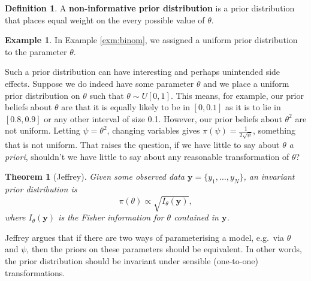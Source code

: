 \documentclass[
]{book}
\newtheorem{theorem}{Theorem}[chapter]
\theoremstyle{definition}
\newtheorem{definition}{Definition}[chapter]
\theoremstyle{definition}
\newtheorem{example}{Example}[chapter]
\theoremstyle{definition}
\theoremstyle{definition}
\theoremstyle{remark}
\begin{document}
\begin{definition}
A \textbf{non-informative prior distribution} is a prior distribution that places equal weight on the every possible value of \(\theta\).
\end{definition}

\begin{example}
In Example \ref{exm:binom}, we assigned a uniform prior distribution to the parameter \(\theta\).
\end{example}

Such a prior distribution can have interesting and perhaps unintended side effects. Suppose we do indeed have some parameter \(\theta\) and we place a uniform prior distribution on \(\theta\) such that \(\theta \sim U[0, 1]\). This means, for example, our prior beliefs about \(\theta\) are that it is equally likely to be in \([0, 0.1]\) as it is to lie in \([0.8, 0.9]\) or any other interval of size 0.1. However, our prior beliefs about \(\theta^2\) are not uniform. Letting \(\psi = \theta^2\), changing variables gives \(\pi(\psi) = \frac{1}{2\sqrt{\psi}}\), something that is not uniform. That raises the question, if we have little to say about \(\theta\) \textit{a priori}, shouldn't we have little to say about any reasonable transformation of \(\theta\)?

\begin{theorem}[Jeffrey]
Given some observed data \(\boldsymbol{y} = \{y_1, \ldots, y_N\}\), an invariant prior distribution is
\[
\pi(\theta) \propto \sqrt{I_\theta(\boldsymbol{y})},
\]
where \(I_\theta(\boldsymbol{y})\) is the Fisher information for \(\theta\) contained in \(\boldsymbol{y}\).
\end{theorem}

Jeffrey argues that if there are two ways of parameterising a model, e.g.~via \(\theta\) and \(\psi\), then the priors on these parameters should be equivalent. In other words, the prior distribution should be invariant under sensible (one-to-one) transformations.
\end{document}
